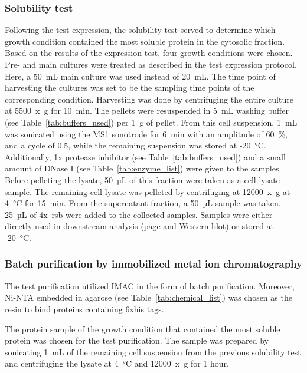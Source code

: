 \subsubsection{Solubility test} \label{txt:Testsol}
Following the test expression, the solubility test served to determine which growth condition contained the most soluble protein in the cytosolic fraction. Based on the results of the expression test, four growth conditions were chosen. Pre- and main cultures were treated as described in the test expression protocol.  Here, a 50~mL main culture was used instead of 20~mL.  The time point of harvesting the cultures was set to be the sampling time points of the corresponding condition. Harvesting was done by centrifuging the entire culture at 5500~x~g for 10~min. The pellets were resuspended in 5~mL washing buffer (see Table~\ref{tab:buffers_used}) per 1~g of pellet. From this cell suspension, 1~mL was sonicated using the MS1 sonotrode for 6~min with an amplitude of 60~\%, and a cycle of 0.5, while the remaining suspension was stored at -20~°C. Additionally, 1x protease inhibitor (see Table~\ref{tab:buffers_used}) and a small amount of DNase I (see Table~\ref{tab:enzyme_list}) were given to the samples. Before pelleting the lysate, 50~µL of this fraction were taken as a cell lysate sample. The remaining cell lysate was pelleted by centrifuging at 12000~x~g at 4~°C for 15~min. From the supernatant fraction, a 50~µL sample was taken. 25~µL of 4x~\gls{rsb} were added to the collected samples. Samples were either directly used in downstream analysis (\gls{page} and Western blot) or stored at -20~°C.
\subsubsection{Batch purification by immobilized metal ion chromatography} \label{txt:Testpuri}
The test purification utilized \gls{IMAC} \parencite{porath_immobilized_1992} in the form of batch purification. Moreover, \gls{Ni-NTA} embedded in agarose (see Table~\ref{tab:chemical_list}) was chosen as the resin to bind proteins containing \gls{6xhis} tags.  

\par The protein sample of the growth condition that contained the most soluble protein was chosen for the test purification. The sample was prepared by sonicating 1~mL of the remaining cell suspension from the previous solubility test and centrifuging the lysate at 4~°C and 12000~x~g for 1 hour.   

